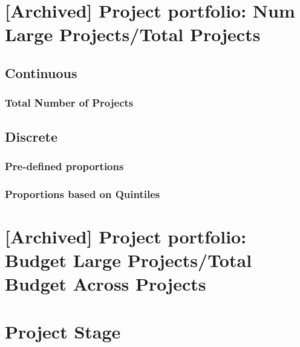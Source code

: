 \documentclass[
]{article}
\begin{document}
\hypertarget{archived-project-portfolio-num-large-projectstotal-projects}{%
\section{{[}Archived{]} Project portfolio: Num Large Projects/Total
Projects}\label{archived-project-portfolio-num-large-projectstotal-projects}}

\hypertarget{continuous}{%
\subsection{Continuous}\label{continuous}}

\hypertarget{total-number-of-projects}{%
\subsubsection{Total Number of
Projects}\label{total-number-of-projects}}

\hypertarget{discrete}{%
\subsection{Discrete}\label{discrete}}

\hypertarget{pre-defined-proportions}{%
\subsubsection{Pre-defined proportions}\label{pre-defined-proportions}}

\hypertarget{proportions-based-on-quintiles}{%
\subsubsection{Proportions based on
Quintiles}\label{proportions-based-on-quintiles}}

\hypertarget{archived-project-portfolio-budget-large-projectstotal-budget-across-projects}{%
\section{{[}Archived{]} Project portfolio: Budget Large Projects/Total
Budget Across
Projects}\label{archived-project-portfolio-budget-large-projectstotal-budget-across-projects}}

\hypertarget{project-stage}{%
\section{Project Stage}\label{project-stage}}
\end{document}
